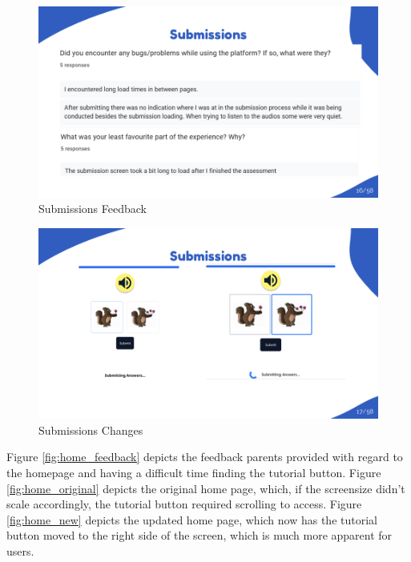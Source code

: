\documentclass{article}
\begin{document}
\begin{figure}[H]
  \centering
  \includegraphics[width=\textwidth]{images/slide16.png}
  \caption{Submissions Feedback}
  \label{fig:submissions_feedback}
\end{figure}

\begin{figure}[H]
  \centering
  \includegraphics[width=\textwidth]{images/slide17.png}
  \caption{Submissions Changes}
  \label{fig:submissions_changes}
\end{figure}

\newpage

Figure \ref{fig:home_feedback} depicts the feedback parents provided with regard to the homepage and having a difficult time finding the tutorial button.
Figure \ref{fig:home_original} depicts the original home page, which, if the screensize didn't scale accordingly, the tutorial button required scrolling to access.
Figure \ref{fig:home_new} depicts the updated home page, which now has the tutorial button moved to the right side of the screen, which is much more apparent for users.
\end{document}
